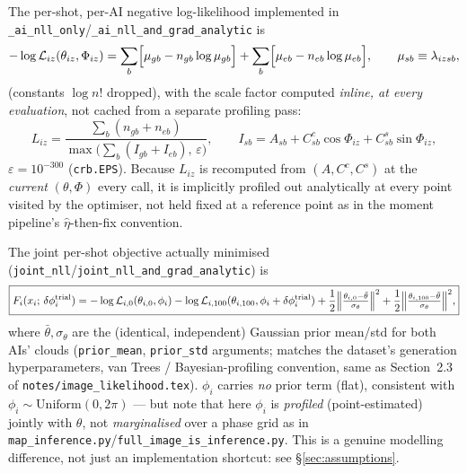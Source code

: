 \documentclass[11pt,a4paper]{article}
\newcommand{\Lcal}{\mathcal{L}}
\newcommand{\code}[1]{\texttt{#1}}
\begin{document}
The per-shot, per-AI negative log-likelihood implemented in
\code{\_ai\_nll\_only}/\code{\_ai\_nll\_and\_grad\_analytic} is
\begin{equation}
  -\log\Lcal_{iz}(\theta_{iz},\Phi_{iz})
  = \sum_b\Bigl[\mu_{gb} - n_{gb}\log\mu_{gb}\Bigr]
   +\sum_b\Bigl[\mu_{eb} - n_{eb}\log\mu_{eb}\Bigr],
  \qquad \mu_{sb} \equiv \lambda_{izsb},
  \label{eq:nll_ai}
\end{equation}
(constants $\log n!$ dropped), with the scale factor computed \emph{inline,
at every evaluation}, not cached from a separate profiling pass:
\begin{equation}
  L_{iz} = \frac{\sum_b (n_{gb}+n_{eb})}{\max\bigl(\sum_b(I_{gb}+I_{eb}),\,\varepsilon\bigr)},
  \qquad I_{sb} = A_{sb} + C^c_{sb}\cos\Phi_{iz} + C^s_{sb}\sin\Phi_{iz},
  \label{eq:Lfix-recap}
\end{equation}
$\varepsilon = 10^{-300}$ (\code{crb.EPS}). Because $L_{iz}$ is recomputed
from $(A,C^c,C^s)$ at the \emph{current} $(\theta,\Phi)$ every call, it is
implicitly profiled out analytically at every point visited by the
optimiser, not held fixed at a reference point as in the moment pipeline's
$\hat\eta$-then-fix convention.

The joint per-shot objective actually minimised
(\code{joint\_nll}/\code{joint\_nll\_and\_grad\_analytic}) is
\begin{equation}
  \boxed{
  F_i(x_i;\,\delta\phi_i^{\rm trial})
  = -\log\Lcal_{i,0}(\theta_{i,0},\phi_i)
    -\log\Lcal_{i,100}(\theta_{i,100},\phi_i+\delta\phi_i^{\rm trial})
    + \frac{1}{2}\Bigl\|\tfrac{\theta_{i,0}-\bar\theta}{\sigma_\theta}\Bigr\|^2
    + \frac{1}{2}\Bigl\|\tfrac{\theta_{i,100}-\bar\theta}{\sigma_\theta}\Bigr\|^2,
  }
  \label{eq:Fi}
\end{equation}
where $\bar\theta,\sigma_\theta$ are the (identical, independent) Gaussian
prior mean/std for both AIs' clouds (\code{prior\_mean}, \code{prior\_std}
arguments; matches the dataset's generation hyperparameters, van Trees /
Bayesian-profiling convention, same as Section~2.3 of
\code{notes/image\_likelihood.tex}). $\phi_i$ carries \emph{no} prior term
(flat), consistent with $\phi_i\sim\mathrm{Uniform}(0,2\pi)$ --- but note
that here $\phi_i$ is \emph{profiled} (point-estimated) jointly with
$\theta$, not \emph{marginalised} over a phase grid as in
\code{map\_inference.py}/\code{full\_image\_is\_inference.py}. This is a
genuine modelling difference, not just an implementation shortcut: see
\S\ref{sec:assumptions}.

\end{document}
